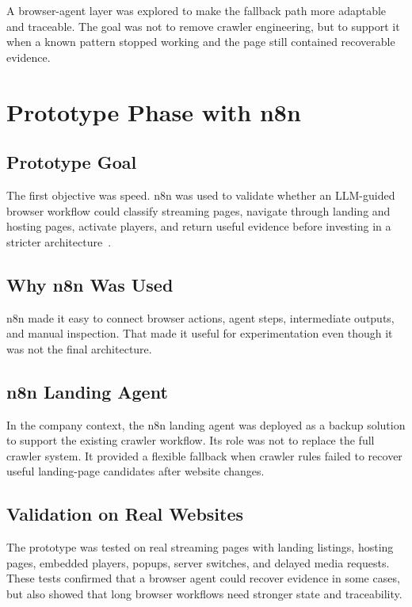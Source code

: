 A browser-agent layer was explored to make the fallback path more adaptable and
traceable. The goal was not to remove crawler engineering, but to support it
when a known pattern stopped working and the page still contained recoverable
evidence.

\section{Prototype Phase with n8n}

\subsection{Prototype Goal}

The first objective was speed. n8n was used to validate whether an LLM-guided
browser workflow could classify streaming pages, navigate through landing and
hosting pages, activate players, and return useful evidence before investing in
a stricter architecture~\cite{n8n}.

\subsection{Why n8n Was Used}

n8n made it easy to connect browser actions, agent steps, intermediate outputs,
and manual inspection. That made it useful for experimentation even though it
was not the final architecture.

\subsection{n8n Landing Agent}

In the company context, the n8n landing agent was deployed as a backup solution
to support the existing crawler workflow. Its role was not to replace the full
crawler system. It provided a flexible fallback when crawler rules failed to
recover useful landing-page candidates after website changes.



\subsection{Validation on Real Websites}

The prototype was tested on real streaming pages with landing listings,
hosting pages, embedded players, popups, server switches, and delayed media
requests. These tests confirmed that a browser agent could recover evidence in
some cases, but also showed that long browser workflows need stronger state and
traceability.

